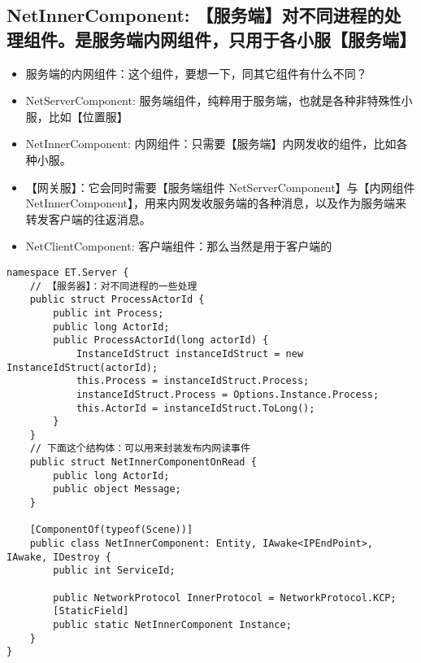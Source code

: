 \documentclass[9pt, b5paper]{article}
\begin{document}
\subsection{NetInnerComponent: 【服务端】对不同进程的处理组件。是服务端内网组件，只用于各小服【服务端】}
\label{sec-3-10}
\begin{itemize}
\item 服务端的内网组件：这个组件，要想一下，同其它组件有什么不同？
\item NetServerComponent: 服务端组件，纯粹用于服务端，也就是各种非特殊性小服，比如【位置服】
\item NetInnerComponent: 内网组件：只需要【服务端】内网发收的组件，比如各种小服。
\item 【网关服】：它会同时需要【服务端组件 NetServerComponent】与【内网组件NetInnerComponent】，用来内网发收服务端的各种消息，以及作为服务端来转发客户端的往返消息。
\item NetClientComponent: 客户端组件：那么当然是用于客户端的
\end{itemize}
\begin{verbatim}
namespace ET.Server {
    // 【服务器】：对不同进程的一些处理
    public struct ProcessActorId {
        public int Process;
        public long ActorId;
        public ProcessActorId(long actorId) {
            InstanceIdStruct instanceIdStruct = new InstanceIdStruct(actorId);
            this.Process = instanceIdStruct.Process;
            instanceIdStruct.Process = Options.Instance.Process;
            this.ActorId = instanceIdStruct.ToLong();
        }
    }
    // 下面这个结构体：可以用来封装发布内网读事件
    public struct NetInnerComponentOnRead {
        public long ActorId;
        public object Message;
    }
    
    [ComponentOf(typeof(Scene))]
    public class NetInnerComponent: Entity, IAwake<IPEndPoint>, IAwake, IDestroy {
        public int ServiceId;
        
        public NetworkProtocol InnerProtocol = NetworkProtocol.KCP;
        [StaticField]
        public static NetInnerComponent Instance;
    }
}
\end{verbatim}
\end{document}
